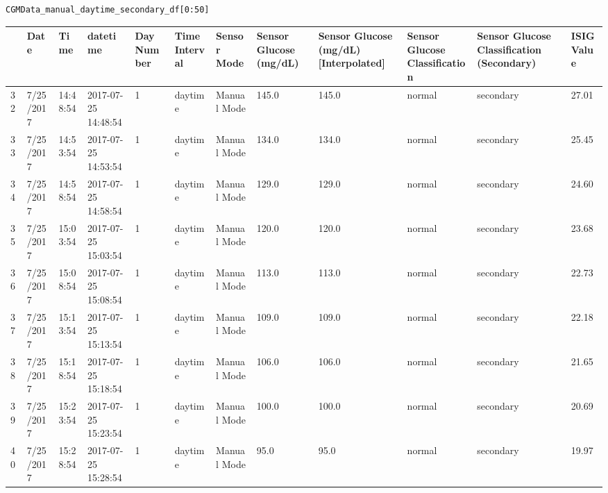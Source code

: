 \bigskip

\begin{verbatim}
CGMData_manual_daytime_secondary_df[0:50]
\end{verbatim}

\bigskip\noindent
\begin{tabular}{p{}p{}p{}p{}p{}p{}p{}p{}p{}p{}p{}p{}}
\toprule
 & Date & Time & datetime & Day Number & Time Interval & Sensor Mode & Sensor Glucose (mg/dL) & Sensor Glucose (mg/dL) [Interpolated] & Sensor Glucose Classification & Sensor Glucose Classification (Secondary) & ISIG Value \\
\hline
32 & 7/25/2017 & 14:48:54 & 2017-07-25 14:48:54 & 1 & daytime & Manual Mode & 145.0 & 145.0 & normal & secondary & 27.01 \\
\hline
33 & 7/25/2017 & 14:53:54 & 2017-07-25 14:53:54 & 1 & daytime & Manual Mode & 134.0 & 134.0 & normal & secondary & 25.45 \\
\hline
34 & 7/25/2017 & 14:58:54 & 2017-07-25 14:58:54 & 1 & daytime & Manual Mode & 129.0 & 129.0 & normal & secondary & 24.60 \\
\hline
35 & 7/25/2017 & 15:03:54 & 2017-07-25 15:03:54 & 1 & daytime & Manual Mode & 120.0 & 120.0 & normal & secondary & 23.68 \\
\hline
36 & 7/25/2017 & 15:08:54 & 2017-07-25 15:08:54 & 1 & daytime & Manual Mode & 113.0 & 113.0 & normal & secondary & 22.73 \\
\hline
37 & 7/25/2017 & 15:13:54 & 2017-07-25 15:13:54 & 1 & daytime & Manual Mode & 109.0 & 109.0 & normal & secondary & 22.18 \\
\hline
38 & 7/25/2017 & 15:18:54 & 2017-07-25 15:18:54 & 1 & daytime & Manual Mode & 106.0 & 106.0 & normal & secondary & 21.65 \\
\hline
39 & 7/25/2017 & 15:23:54 & 2017-07-25 15:23:54 & 1 & daytime & Manual Mode & 100.0 & 100.0 & normal & secondary & 20.69 \\
\hline
40 & 7/25/2017 & 15:28:54 & 2017-07-25 15:28:54 & 1 & daytime & Manual Mode & 95.0 & 95.0 & normal & secondary & 19.97 \\

\end{tabular}
